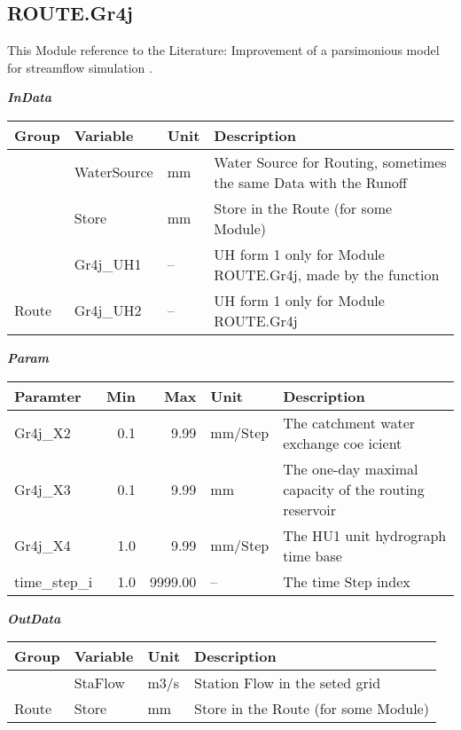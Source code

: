 \documentclass[
]{book}
\begin{document}
\hypertarget{route.gr4j}{%
\subsection{ROUTE.Gr4j}\label{route.gr4j}}

This Module reference to the Literature: Improvement of a parsimonious model for streamflow simulation \citep{Perrin.2003}.

\textbf{\emph{InData}}

\begin{table}[!h]
\centering
\begin{tabular}{l|l|l|l}
\hline
Group & Variable & Unit & Description\\
\hline
 & WaterSource & mm & Water Source for Routing, sometimes the same Data with the Runoff\\
\cline{2-4}
 & Store & mm & Store in the Route (for some Module)\\
\cline{2-4}
 & Gr4j\_UH1 & -- & UH form 1 only for Module ROUTE.Gr4j, made by the function\\
\cline{2-4}
\multirow{-4}{*}{\raggedright\arraybackslash Route} & Gr4j\_UH2 & -- & UH form 1 only for Module ROUTE.Gr4j\\
\hline
\end{tabular}
\end{table}

\textbf{\emph{Param}}

\begin{table}[!h]
\centering
\begin{tabular}{l|r|r|l|l}
\hline
Paramter & Min & Max & Unit & Description\\
\hline
Gr4j\_X2 & 0.1 & 9.99 & mm/Step & The catchment water exchange coe icient\\
\cline{1-5}
Gr4j\_X3 & 0.1 & 9.99 & mm & The one-day maximal capacity of the routing reservoir\\
\cline{1-5}
Gr4j\_X4 & 1.0 & 9.99 & mm/Step & The HU1 unit hydrograph time base\\
\cline{1-5}
time\_step\_i & 1.0 & 9999.00 & -- & The time Step index\\
\hline
\end{tabular}
\end{table}

\textbf{\emph{OutData}}

\begin{table}[!h]
\centering
\begin{tabular}{l|l|l|l}
\hline
Group & Variable & Unit & Description\\
\hline
 & StaFlow & m3/s & Station Flow in the seted grid\\
\cline{2-4}
\multirow{-2}{*}{\raggedright\arraybackslash Route} & Store & mm & Store in the Route (for some Module)\\
\hline
\end{tabular}
\end{table}
\end{document}
